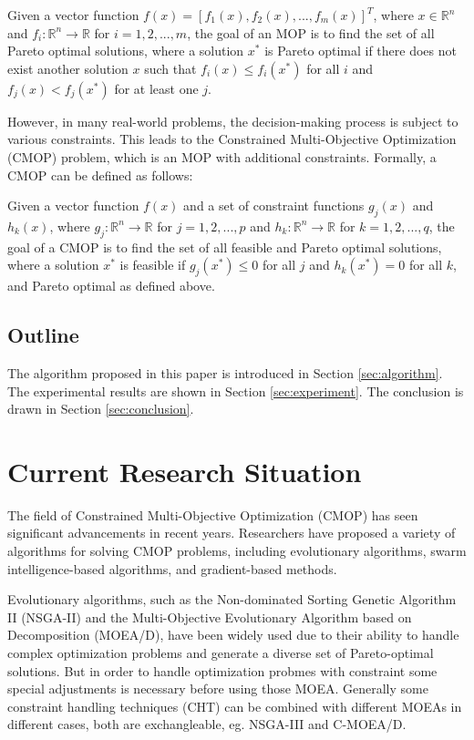 \documentclass[sigconf]{acmart}
\begin{document}
Given a vector function \(f(x) = [f_1(x), f_2(x), ..., f_m(x)]^T\), where \(x \in \mathbb{R}^n\) and \(f_i: \mathbb{R}^n \rightarrow \mathbb{R}\) for \(i = 1, 2, ..., m\), the goal of an MOP is to find the set of all Pareto optimal solutions, where a solution \(x^*\) is Pareto optimal if there does not exist another solution \(x\) such that \(f_i(x) \leq f_i(x^*)\) for all \(i\) and \(f_j(x) < f_j(x^*)\) for at least one \(j\).

However, in many real-world problems, the decision-making process is subject to various constraints. This leads to the Constrained Multi-Objective Optimization (CMOP) problem, which is an MOP with additional constraints. Formally, a CMOP can be defined as follows:

Given a vector function \(f(x)\) and a set of constraint functions \(g_j(x)\) and \(h_k(x)\), where \(g_j: \mathbb{R}^n \rightarrow \mathbb{R}\) for \(j = 1, 2, ..., p\) and \(h_k: \mathbb{R}^n \rightarrow \mathbb{R}\) for \(k = 1, 2, ..., q\), the goal of a CMOP is to find the set of all feasible and Pareto optimal solutions, where a solution \(x^*\) is feasible if \(g_j(x^*) \leq 0\) for all \(j\) and \(h_k(x^*) = 0\) for all \(k\), and Pareto optimal as defined above.


\subsection*{Outline}
The algorithm proposed in this paper is introduced in Section \ref{sec:algorithm}. The experimental results are shown in Section \ref{sec:experiment}. The conclusion is drawn in Section \ref{sec:conclusion}.


\section{Current Research Situation}

The field of Constrained Multi-Objective Optimization (CMOP) has seen significant advancements in recent years. Researchers have proposed a variety of algorithms for solving CMOP problems, including evolutionary algorithms, swarm intelligence-based algorithms, and gradient-based methods.

Evolutionary algorithms, such as the Non-dominated Sorting Genetic Algorithm II\cite{nsga2} (NSGA-II) and the Multi-Objective Evolutionary Algorithm based on Decomposition (MOEA/D)\cite{moead}, have been widely used due to their ability to handle complex optimization problems and generate a diverse set of Pareto-optimal solutions. But in order to handle optimization probmes with constraint some special adjustments is necessary before using those MOEA. Generally some constraint handling techniques (CHT) can be combined with different MOEAs in different cases, both are exchangleable, eg. NSGA-III\cite{NSGAIII} and C-MOEA/D\cite{cmoead}.
\end{document}
